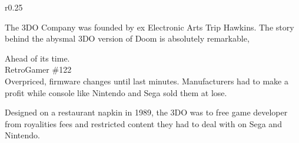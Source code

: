 \begin{wrapfigure}[22]{r}{0.25\textwidth}{
\centering {}}
\end{wrapfigure}
The 3DO Company was founded by ex Electronic Arts Trip Hawkins. The story behind the abysmal 3DO version of Doom is absolutely remarkable,
\par
Ahead of its time.\\
RetroGamer \#122\\
Overpriced, firmware changes until last minutes. Manufacturers had to make a profit while console like Nintendo and Sega sold them at lose.\\
\par
Designed on a restaurant napkin in 1989, the 3DO was to free game developer from royalities fees and restricted content they had to deal with on Sega and Nintendo.\\
\\
\par

